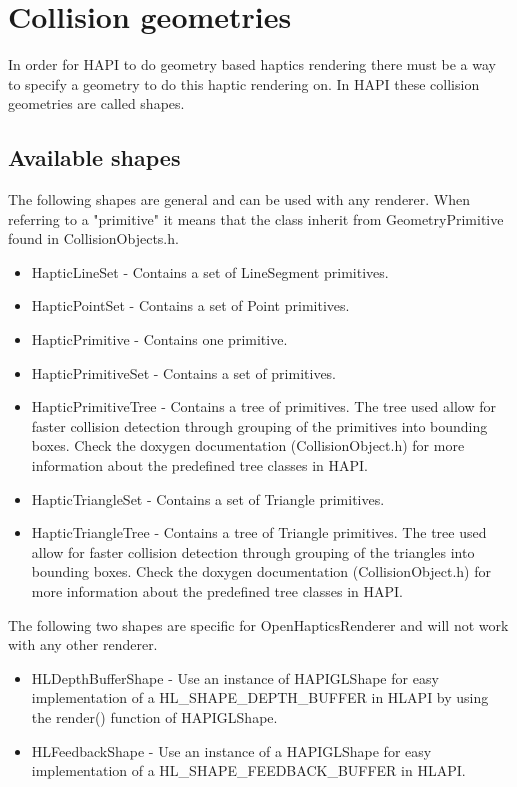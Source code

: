 \chapter{Collision geometries}
In order for HAPI to do geometry based haptics rendering there must be a way to
specify a geometry to do this haptic rendering on. In HAPI these collision
geometries are called shapes.

\section{Available shapes}
The following shapes are general and can be used with any renderer. When
referring to a "primitive" it means that the class inherit from
GeometryPrimitive found in CollisionObjects.h.

\begin{itemize}
\item HapticLineSet - Contains a set of LineSegment primitives.
\item HapticPointSet - Contains a set of Point primitives.
\item HapticPrimitive - Contains one primitive.
\item HapticPrimitiveSet - Contains a set of primitives.
\item HapticPrimitiveTree - Contains a tree of primitives. The tree used
allow for faster collision detection through grouping of the primitives
into bounding boxes. Check the doxygen documentation (CollisionObject.h)
for more information about the predefined tree classes in HAPI.
\item HapticTriangleSet - Contains a set of Triangle primitives.
\item HapticTriangleTree - Contains a tree of Triangle primitives. The tree used
allow for faster collision detection through grouping of the triangles
into bounding boxes. Check the doxygen documentation (CollisionObject.h)
for more information about the predefined tree classes in HAPI.
\end{itemize}

The following two shapes are specific for OpenHapticsRenderer and will not
work with any other renderer.
\begin{itemize}
\item HLDepthBufferShape - Use an instance of HAPIGLShape for easy
implementation of a HL\-\_SHAPE\-\_DEPTH\-\_BUFFER in HLAPI by using the render()
function of HAPIGLShape.
\item HLFeedbackShape - Use an instance of a HAPIGLShape for easy
implementation of a HL\-\_SHAPE\-\_FEEDBACK\-\_BUFFER in HLAPI.
\end{itemize}

